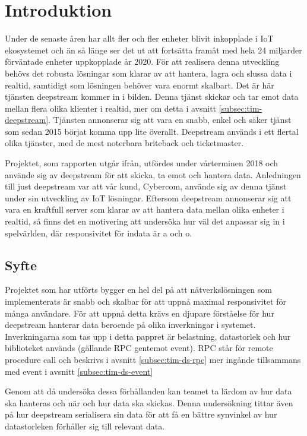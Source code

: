 \section{Introduktion}

Under de senaste åren har allt fler och fler enheter blivit inkopplade i IoT ekosystemet och än så länge ser det ut att fortsätta framåt med hela 24 miljarder förväntade enheter uppkopplade år 2020.\cite{IoT-ecosystem} För att realisera denna utveckling behövs det robusta lösningar som klarar av att hantera, lagra och slussa data i realtid, samtidigt som lösningen behöver vara enormt skalbart. Det är här tjänsten deepstream kommer in i bilden.\cite{deepstream} Denna tjänst skickar och tar emot data mellan flera olika klienter i realtid, mer om detta i avsnitt \ref{subsec:tim-deepstream}. Tjänsten annonserar sig att vara en snabb, enkel och säker tjänst som sedan 2015 börjat komma upp lite överallt. Deepstream används i ett flertal olika tjänster, med de mest noterbara briteback och ticketmaster.\cite{ds-usecases}

Projektet, som rapporten utgår ifrån, utfördes under vårterminen 2018 och använde sig av deepstream för att skicka, ta emot och hantera data. Anledningen till just deepstream var att vår kund, Cybercom, använde sig av denna tjänst under sin utveckling av IoT lösningar. Eftersom deepstream annonserar sig att vara en kraftfull server som klarar av att hantera data mellan olika enheter i realtid, så finns det en motivering att undersöka hur väl det anpassar sig in i spelvärlden, där responsivitet för indata är a och o.

\subsection{Syfte}
\label{subsec:tim-aim}
Projektet som har utförts bygger en hel del på att nätverkslösningen som implementerats är snabb och skalbar för att uppnå maximal responsivitet för många användare. För att uppnå detta krävs en djupare förståelse för hur deepstream hanterar data beroende på olika inverkningar i systemet. Inverkningarna som tas upp i detta pappret är belastning, datastorlek och hur biblioteket används (gällande RPC gentemot event). RPC står för remote procedure call och beskrivs i avsnitt \ref{subsec:tim-ds-rpc} mer ingånde tillsammans med event i avsnitt \ref{subsec:tim-ds-event}

Genom att då undersöka dessa förhållanden kan teamet ta lärdom av hur data ska hanteras och när och hur data ska skickas. Denna undersökning tittar även på hur deepstream serialisera sin data för att få en bättre synvinkel av hur datastorleken förhåller sig till relevant data.

